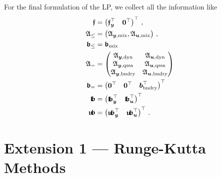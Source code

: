 \documentclass{article}
\newcommand{\tp}{\top}%
\newcommand{\vectorfont}[1]{\boldsymbol{#1}}%
\newcommand{\greekvectorfont}[1]{\boldsymbol{#1}}%
\newcommand{\matrixfont}[1]{\mathbf{#1}}%
\newcommand{\bvec}{\vectorfont{b}}
\newcommand{\uvec}{\vectorfont{u}}
\newcommand{\yvec}{\vectorfont{y}}
\newcommand{\bfrakvec}{\vectorfont{\mathfrak{b}}}
\newcommand{\ffrakvec}{\vectorfont{\mathfrak{f}}}
\newcommand{\nullvec}{\greekvectorfont{0}}
\newcommand{\lbfrakvec}{\vectorfont{\mathfrak{l\negthinspace b}}}
\newcommand{\ubfrakvec}{\vectorfont{\mathfrak{u\negthinspace b}}}
\newcommand{\Afrakmat}{\matrixfont{\mathfrak{A}}}
\begin{document}
For the final formulation of the LP, we collect all the information like
\begin{align*}
\ffrakvec &= \begin{pmatrix} \ffrakvec_{\yvec}^{\tp} & \nullvec^{\tp} \end{pmatrix}^{\tp}\,,
\\
\Afrakmat_{\leq} &= \begin{pmatrix} \Afrakmat_{\yvec,\mathrm{mix}}, \Afrakmat_{\uvec,\mathrm{mix}} \end{pmatrix}\,,
\\
\bfrakvec_{\leq} &= \bfrakvec_{\mathrm{mix}}
\\
\Afrakmat_{=} &= \begin{pmatrix} 
                     \Afrakmat_{\yvec, \mathrm{dyn}} & \Afrakmat_{\uvec, \mathrm{dyn}} \\
                     \Afrakmat_{\yvec, \mathrm{qssa}} & \Afrakmat_{\uvec, \mathrm{qssa}} \\
                     \Afrakmat_{\yvec, \mathrm{bndry}} & \Afrakmat_{\uvec, \mathrm{bndry}}
                 \end{pmatrix}
\\
\bfrakvec_{=} &= \begin{pmatrix} \nullvec^{\tp} & \nullvec^{\tp} & \bvec_{\mathrm{bndry}}^{\tp}\end{pmatrix}^{\tp}
\\
\lbfrakvec &= \begin{pmatrix} \lbfrakvec_{\yvec}^{\tp} & \lbfrakvec_{\uvec}^{\tp} \end{pmatrix}^{\tp}
\\
\ubfrakvec &= \begin{pmatrix} \ubfrakvec_{\yvec}^{\tp} & \ubfrakvec_{\uvec}^{\tp} \end{pmatrix}^{\tp}\,.
\end{align*}



%
\newpage

\section*{Extension 1 --- Runge-Kutta Methods}
\end{document}
